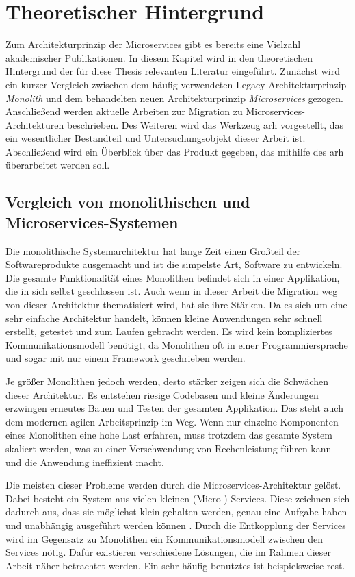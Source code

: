 \chapter{Theoretischer Hintergrund}
\label{chap:theoretischer-hintergrund}
Zum Architekturprinzip der Microservices gibt es bereits eine Vielzahl akademischer Publikationen.
In diesem Kapitel wird in den theoretischen Hintergrund der für diese Thesis relevanten Literatur eingeführt.
Zunächst wird ein kurzer Vergleich zwischen dem häufig verwendeten Legacy-Architekturprinzip \emph{Monolith} und dem behandelten neuen Architekturprinzip \emph{Microservices} gezogen.
Anschließend werden aktuelle Arbeiten zur Migration zu Microservices-Architekturen beschrieben.
Des Weiteren wird das Werkzeug \gls{arh} vorgestellt, das ein wesentlicher Bestandteil und Untersuchungsobjekt dieser Arbeit ist.
Abschließend wird ein Überblick über das Produkt gegeben, das mithilfe des \gls{arh} überarbeitet werden soll.

\section{Vergleich von monolithischen und Microservices-Systemen}

Die monolithische Systemarchitektur hat lange Zeit einen Großteil der Softwareprodukte ausgemacht und ist die simpelste Art, Software zu entwickeln.
Die gesamte Funktionalität eines Monolithen befindet sich in einer Applikation, die in sich selbst geschlossen ist.
Auch wenn in dieser Arbeit die Migration weg von dieser Architektur thematisiert wird, hat sie ihre Stärken.
Da es sich um eine sehr einfache Architektur handelt, können kleine Anwendungen sehr schnell erstellt, getestet und zum Laufen gebracht werden.
Es wird kein kompliziertes Kommunikationsmodell benötigt, da Monolithen oft in einer Programmiersprache und sogar mit nur einem Framework geschrieben werden.

Je größer Monolithen jedoch werden, desto stärker zeigen sich die Schwächen dieser Architektur.
Es entstehen riesige Codebasen und kleine Änderungen erzwingen erneutes Bauen und Testen der gesamten Applikation.
Das steht auch dem modernen agilen Arbeitsprinzip im Weg.
Wenn nur einzelne Komponenten eines Monolithen eine hohe Last erfahren, muss trotzdem das gesamte System skaliert werden, was zu einer Verschwendung von Rechenleistung führen kann und die Anwendung ineffizient macht.

Die meisten dieser Probleme werden durch die Microservices-Architektur gelöst.
Dabei besteht ein System aus vielen kleinen (Micro-) Services.
Diese zeichnen sich dadurch aus, dass sie möglichst klein gehalten werden, genau eine Aufgabe haben und unabhängig ausgeführt werden können \cite{10220070}.
Durch die Entkopplung der Services wird im Gegensatz zu Monolithen ein Kommunikationsmodell zwischen den Services nötig.
Dafür existieren verschiedene Lösungen, die im Rahmen dieser Arbeit näher betrachtet werden.
Ein sehr häufig benutztes ist beispielsweise \gls{rest}.

